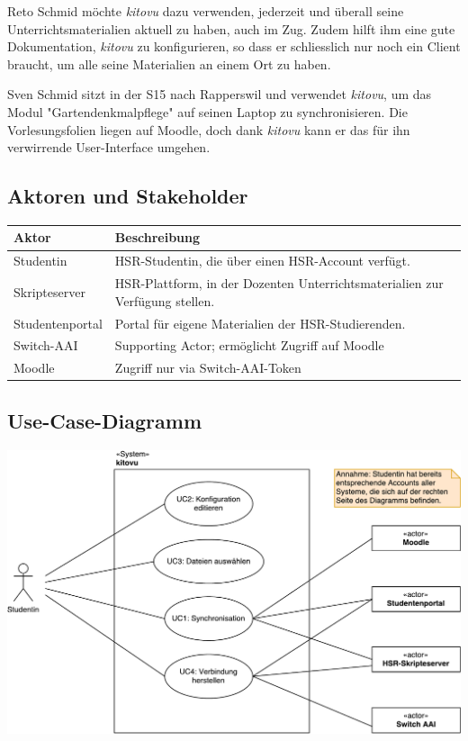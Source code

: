 \documentclass[a4paper]{article}
\begin{document}
\begin{description}[uclist]
	\item[Erwartungen an \emph{kitovu}] Reto Schmid möchte \emph{kitovu} dazu verwenden, jederzeit und überall seine Unterrichtsmaterialien aktuell zu haben, auch im Zug. Zudem hilft ihm eine gute Dokumentation, \emph{kitovu} zu konfigurieren, so dass er schliesslich nur noch ein Client braucht, um alle seine Materialien an einem Ort zu haben.
	\item[Szenario: "Unterwegs"] Sven Schmid sitzt in der S15 nach Rapperswil und verwendet \emph{kitovu}, um das Modul "Gartendenkmalpflege" auf seinen Laptop zu synchronisieren. Die Vorlesungsfolien liegen auf Moodle, doch dank \emph{kitovu} kann er das für ihn verwirrende User-Interface umgehen.
\end{description}

\pagebreak
\subsection{Aktoren und Stakeholder}

\begin{tabulary}{\linewidth}{lL}
	\toprule
	Aktor & Beschreibung\\
	\midrule
	Studentin & HSR-Studentin, die über einen HSR-Account verfügt.\\
	Skripteserver & HSR-Plattform, in der Dozenten Unterrichtsmaterialien zur Verfügung stellen.\\
	Studentenportal & Portal für eigene Materialien der HSR-Studierenden.\\
	Switch-AAI & Supporting Actor; ermöglicht Zugriff auf Moodle \\	
	Moodle & Zugriff nur via Switch-AAI-Token\\
	
	\bottomrule
\end{tabulary}

\subsection{Use-Case-Diagramm}


\includegraphics[width=40em]{./img/uc_diagram_kitovu.pdf}
\end{document}
